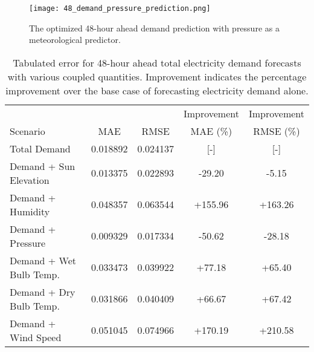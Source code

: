 \begin{figure*}[!ht]
  \centering
  \texttt{[image: 48\_demand\_pressure\_prediction.png]}
  \caption{The optimized 48-hour ahead demand prediction with pressure as a  meteorological
  predictor.}
  \label{fig:48demand}
\end{figure*}

  \begin{table*}[!ht]
    \centering
    \caption{Tabulated error for 48-hour ahead total electricity demand forecasts with various coupled quantities. Improvement indicates the percentage improvement over the base case of forecasting electricity demand alone.}
    \label{tab:demand48}
    \begin{tabular}{l|c|c|c|c}
      &  & & Improvement & Improvement \\
      Scenario  & MAE & RMSE & MAE (\%) & RMSE (\%)\\
      \hline
      Total Demand & 0.018892 & 0.024137 & [-] & [-] \\
      Demand + Sun Elevation & 0.013375 & 0.022893 & -29.20& -5.15 \\
      Demand + Humidity & 0.048357 & 0.063544 & +155.96 & +163.26 \\
      Demand + Pressure & 0.009329 & 0.017334 & -50.62 & -28.18\\
      Demand + Wet Bulb Temp. & 0.033473 & 0.039922 & +77.18 & +65.40\\
      Demand + Dry Bulb Temp. & 0.031866 & 0.040409 & +66.67 & +67.42\\
      Demand + Wind Speed & 0.051045 & 0.074966 & +170.19 & +210.58\\
    \end{tabular}
  \end{table*}
